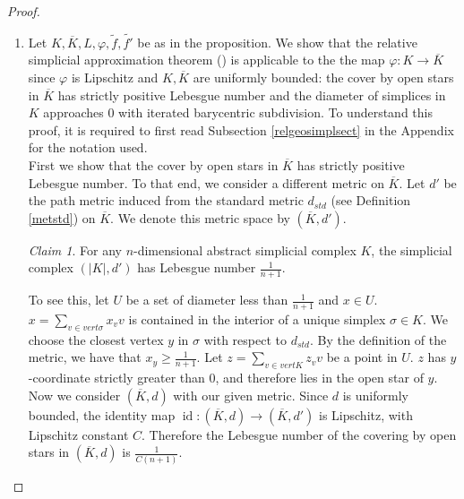 \documentclass[a4paper,11pt]{article}
\theoremstyle{definition}
\theoremstyle{plain}
\theoremstyle{remark}
\newtheorem*{claim}{Claim}
\DeclareMathOperator{\id}{id}
\begin{document}
{\begin{proof}
\begin{enumerate}
\item  Let $K,\overline{K},L, \varphi, \tilde{f}, \tilde{f'}$ be as in the proposition. We show that the relative simplicial approximation theorem (\cite{zeeman1964relative}) is applicable to the the map $\varphi: K\rightarrow \overline{K}$ since $\varphi$ is Lipschitz and $K,\overline{K}$ are uniformly bounded: the cover by open stars in $\overline{K}$ has strictly positive Lebesgue number and the diameter of simplices in $K$ approaches $0$ with iterated barycentric subdivision. To understand this proof, it is required to first read Subsection \ref{relgeosimplsect} in the Appendix for the notation used. \\


First we show that the cover by open stars in $\overline{K}$ has strictly positive Lebesgue number. To that end, we consider a different metric on $\overline{K}$. Let $d'$ be the path metric induced from the standard metric $d_{std}$ (see Definition \ref{metstd}) on $\overline{K}$. We denote this metric space by $(\overline{K},d')$. \\


\begin{claim}
For any $n$-dimensional abstract simplicial complex $K$, the simplicial complex $(|K|,d')$ has Lebesgue number $\frac{1}{n+1}$. 
\end{claim}
To see this, let $U$ be a set of diameter less than $\frac{1}{n+1}$ and $x\in U$. $x = \sum_{v \in vert \sigma} x_{v}v$ is contained in the interior of a unique simplex $\sigma \in K$. We choose the closest vertex $y$ in $\sigma$ with respect to $d_{std}$. By the definition of the metric, we have that $x_{y}\geq \frac{1}{n+1}$. Let $z = \sum_{v\in vert K}z_{v}v$ be a point in $U$. $z$ has $y$-coordinate strictly greater than $0$, and therefore lies in the open star of $y$. \\ 

Now we consider $(\overline{K},d)$ with our given metric. Since $d$ is uniformly bounded, the identity map $\id: (\overline{K},d)\rightarrow (\overline{K},d')$ is Lipschitz, with Lipschitz constant $C$. Therefore the Lebesgue number of the covering by open stars in $(\overline{K},d)$ is $\frac{1}{C(n+1)}$.\\


\end{enumerate}
\end{proof}}
\end{document}
